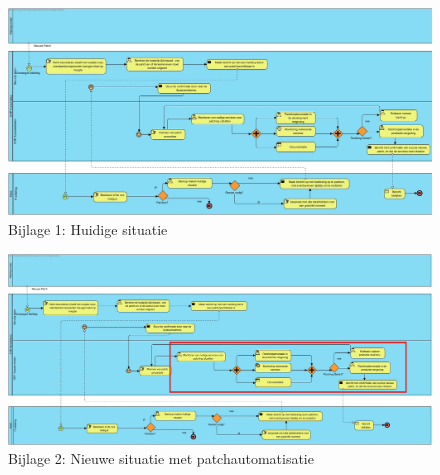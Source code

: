 \documentclass[dutch,dit,thesis]{hogentreport}
\begin{document}
\begin{figure}
    \centering
    \includegraphics[height=0.7\textwidth,angle=270]{huidigesituatie.jpg}
    \caption{Bijlage 1: Huidige situatie}
    \label{fig:huidigesituatie}
\end{figure}

\begin{figure}[htbp]
    \centering
    \includegraphics[height=0.7\textwidth,angle=270]{huidigesituatie2.png}
    \caption{Bijlage 2: Nieuwe situatie met patchautomatisatie}
     \label{fig:huidigesituatie2}
\end{figure}



\backmatter{}

\setlength\bibitemsep{2pt} %
\printbibliography[heading=bibintoc]
\end{document}
